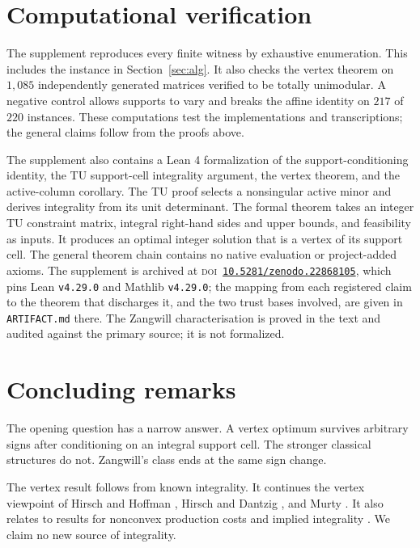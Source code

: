 \documentclass[review,11pt]{elsarticle}
\theoremstyle{remark}
\theoremstyle{definition}
\begin{document}
\section{Computational verification}

The supplement reproduces every finite witness by exhaustive enumeration. This includes
the instance in Section~\ref{sec:alg}. It also checks the vertex theorem on
$1{,}085$ independently generated matrices verified to be totally unimodular. A negative
control allows supports to vary and breaks the affine identity on $217$ of $220$ instances.
These computations test the implementations and transcriptions; the general claims follow
from the proofs above.

The supplement also contains a Lean 4 formalization of the support-conditioning identity,
the TU support-cell integrality argument, the vertex theorem, and the active-column
corollary. The TU proof selects a nonsingular active minor and derives integrality from its
unit determinant. The formal theorem takes an integer TU constraint matrix, integral
right-hand sides and upper bounds, and feasibility as inputs. It produces an optimal
integer solution that is a vertex of its support cell. The general theorem chain contains
no native evaluation or project-added axioms.
The supplement is archived at \textsc{doi}~\href{https://doi.org/10.5281/zenodo.22868105}{\texttt{10.5281/zenodo.22868105}}, which pins Lean \texttt{v4.29.0} and Mathlib \texttt{v4.29.0}; the mapping from each registered claim to the theorem that discharges it, and the two trust bases involved, are given in \texttt{ARTIFACT.md} there. The Zangwill characterisation is proved in the text and audited against the primary source; it is not formalized.

\section{Concluding remarks}

The opening question has a narrow answer. A vertex optimum survives arbitrary signs after
conditioning on an integral support cell. The stronger classical structures do not.
Zangwill's class ends at the same sign change.

The vertex result follows from known integrality. It continues the vertex viewpoint
of Hirsch and Hoffman \cite{hh61}, Hirsch and Dantzig \cite{hd68}, and Murty
\cite{murty68}. It also relates to results for nonconvex production costs
\cite{jr73,sr82} and implied integrality \cite{hw26}. We claim no new source of
integrality.
\end{document}
